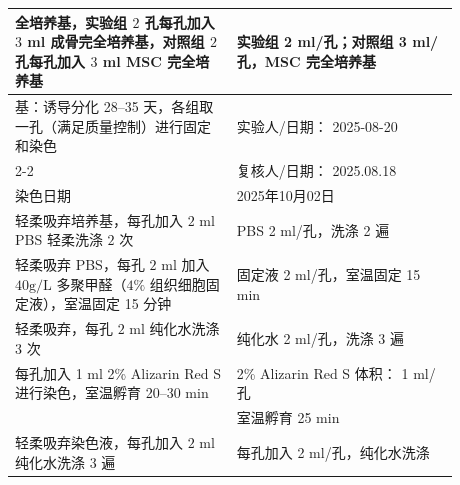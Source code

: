 \documentclass[UTF8,10pt,a4paper,fontset=fandol]{ctexart}
\newcommand{\fieldvalue}[1]{#1}
\newcommand{\handwritten}[1]{#1}
\begin{document}
\begin{tabular}{|p{0.44\linewidth}|p{0.44\linewidth}|}
\hline
全培养基，实验组 $2$ 孔每孔加入 $3$ ml 成骨完全培养基，对照组 $2$ 孔每孔加入 $3$ ml MSC 完全培养基
&
实验组
\fieldvalue{\handwritten{2}} ml/孔；对照组
\fieldvalue{\handwritten{3}} ml/孔，MSC 完全培养基
\\ \hline
基：诱导分化 28--35 天，各组取一孔（满足质量控制）进行固定和染色
&
实验人/日期：
\fieldvalue{\handwritten{2025-08-20}}
\\ \cline{2-2}
&
复核人/日期：
\fieldvalue{\handwritten{2025.08.18}}
\\ \hline
染色日期
&
\fieldvalue{\handwritten{2025年10月02日}}
\\ \hline
轻柔吸弃培养基，每孔加入 $2$ ml PBS 轻柔洗涤 $2$ 次
&
PBS
\fieldvalue{\handwritten{2}} ml/孔，洗涤
\fieldvalue{\handwritten{2}} 遍
\\ \hline
轻柔吸弃 PBS，每孔 $2$ ml 加入 $40\textrm{g/L}$ 多聚甲醛（$4\%$ 组织细胞固定液），室温固定 15 分钟
&
固定液
\fieldvalue{\handwritten{2}} ml/孔，室温固定
\fieldvalue{\handwritten{15}} min
\\ \hline
轻柔吸弃，每孔 $2$ ml 纯化水洗涤 3 次
&
纯化水
\fieldvalue{\handwritten{2}} ml/孔，洗涤
\fieldvalue{\handwritten{3}} 遍
\\ \hline
每孔加入 1 ml 2\% Alizarin Red S 进行染色，室温孵育 20--30 min
&
2\% Alizarin Red S 体积：
\fieldvalue{\handwritten{1}} ml/孔\\
&
室温孵育
\fieldvalue{\handwritten{25}} min
\\ \hline
轻柔吸弃染色液，每孔加入 $2$ ml 纯化水洗涤 3 遍
&
每孔加入
\fieldvalue{\handwritten{2}} ml/孔，纯化水洗涤

\end{tabular}
\end{document}
